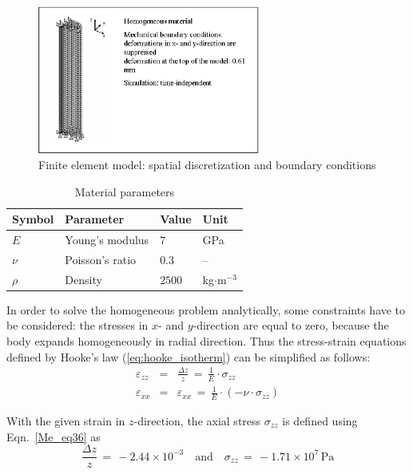 \begin{figure}[htbp]
\centering
\includegraphics[width=0.65\textwidth]{PART_II/M/fig32.eps}
\caption{Finite element model: spatial discretization and boundary conditions}
\label{Me_fig32}
\end{figure}

\begin{table}[!htb]
\centering
\caption{Material parameters}
\label{Me_tab33}
\begin{tabular}{llll}
\toprule
Symbol & Parameter & Value & Unit \\
\midrule
$E$    & Young's modulus & $7$    & GPa \\
$\nu$  & Poisson's ratio & $0.3$  & -- \\
$\rho$ & Density         & $2500$ & kg$\cdot$m$^{-3}$ \\
\bottomrule
\end{tabular}
\end{table}

In order to solve the homogeneous problem analytically, some constraints have to be considered: the stresses in $x$- and $y$-direction are equal to zero, because the body expands homogeneously in radial direction. Thus the stress-strain equations defined by Hooke's law (\ref{eq:hooke_isotherm}) can be simplified as follows:
\begin{eqnarray}
\varepsilon_{zz} & = &
\frac{\Delta z}{z}\,=\,\frac{1}{E}\cdot\sigma_{zz}
\label{Me_eq36} \\[1.5ex]
\varepsilon_{xx} & = &
\varepsilon_{xx}\,=\,\frac{1}{E}\cdot\left(-\nu\cdot\sigma_{zz}\right)
\label{Me_eq37}
\end{eqnarray}

With the given strain in $z$-direction, the axial stress $\sigma_{zz}$ is defined using Eqn.~\ref{Me_eq36} as
\begin{displaymath}
\frac{\Delta z}{z}\,=\,-2.44\times 10^{-3}
\quad\mathrm{and}\quad
\sigma_{zz}\,=\,-1.71\times 10^{7}\,\mathrm{Pa}
\end{displaymath}

